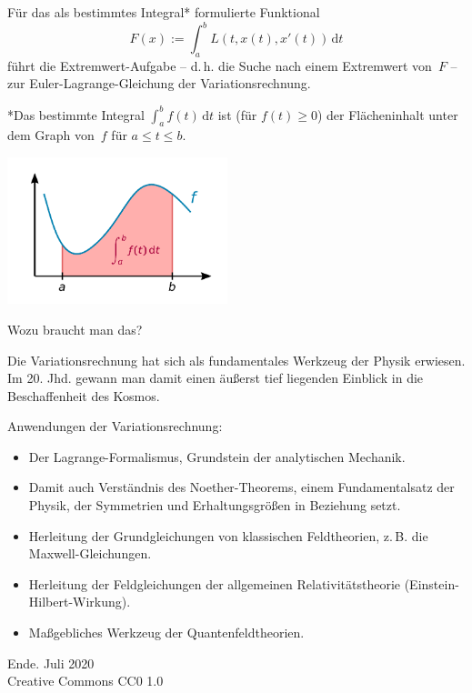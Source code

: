\documentclass[9pt]{beamer}
\newcommand{\modest}[1]{{\small\color{gray}#1}}
\begin{document}
\begin{frame}
Für das als bestimmtes Integral* formulierte Funktional
\[F(x) := \int_a^b L(t,x(t),x'(t))\,\mathrm dt\]
führt die Extremwert-Aufgabe -- d.\,h. die Suche nach einem Extremwert
von~$F$ -- zur Euler-Lagrange-Gleichung der Variationsrechnung.
\end{frame}

\begin{frame}

{\footnotesize
*Das bestimmte Integral $\int_a^b f(t)\,\mathrm dt$
ist (für $f(t)\ge 0$) der Flächeninhalt unter dem Graph
von~$f$ für $a\le t\le b$.}
\begin{center}
\includegraphics[width=64mm]{img/Integral.pdf}
\end{center}
\end{frame}

\begin{frame}
Wozu braucht man das?\pause

\vspace{0.8em}
Die Variationsrechnung hat sich als fundamentales Werkzeug der Physik
erwiesen. Im 20. Jhd. gewann man damit einen äußerst tief liegenden
Einblick in die Beschaffenheit des Kosmos.
\end{frame}

\begin{frame}
Anwendungen der Variationsrechnung:
\begin{itemize}
\item Der Lagrange-Formalismus, Grundstein der analytischen Mechanik.

\item Damit auch Verständnis des Noether-Theorems, einem
Fundamentalsatz der Physik, der Symmetrien und Erhaltungsgrößen
in Beziehung setzt.

\item Herleitung der Grundgleichungen von klassischen Feldtheorien,
z.\,B. die Maxwell-Gleichungen.

\item Herleitung der Feldgleichungen der allgemeinen
Relativitätstheorie (Einstein-Hilbert-Wirkung).

\item Maßgebliches Werkzeug der Quantenfeldtheorien.
\end{itemize}
\end{frame}

\begin{frame}
Ende.
\vfill\hfill\modest{Juli 2020}\\
\hfill\modest{Creative Commons CC0 1.0}
\end{frame}
\end{document}
